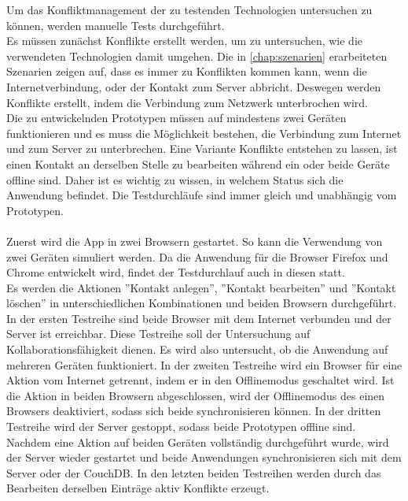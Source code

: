 Um das Konfliktmanagement der zu testenden Technologien untersuchen zu können, werden manuelle Tests durchgeführt.\\
Es müssen zunächst Konflikte erstellt werden, um zu untersuchen, wie die verwendeten Technologien damit umgehen.
Die in \autoref{chap:szenarien} erarbeiteten Szenarien zeigen auf, dass es immer zu Konflikten kommen kann, wenn die Internetverbindung, oder der Kontakt zum Server abbricht.
Deswegen werden Konflikte erstellt, indem die Verbindung zum Netzwerk unterbrochen wird.\\
Die zu entwickelnden Prototypen müssen auf mindestens zwei Geräten funktionieren und es muss die Möglichkeit bestehen, die Verbindung zum Internet und zum Server zu unterbrechen.
Eine Variante Konflikte entstehen zu lassen, ist einen Kontakt an derselben Stelle zu bearbeiten während ein oder beide Geräte offline sind. Daher ist es wichtig zu wissen, in welchem Status sich die Anwendung befindet.
Die Testdurchläufe sind immer gleich und unabhängig vom Prototypen.\\\\
%
%
Zuerst wird die \gls{App} in zwei Browsern gestartet.
So kann die Verwendung von zwei Geräten simuliert werden. Da die Anwendung für die Browser Firefox und Chrome entwickelt wird, findet der Testdurchlauf auch in diesen statt.\\
Es werden die Aktionen ''Kontakt anlegen'', ''Kontakt bearbeiten'' und ''Kontakt löschen'' in unterschiedlichen Kombinationen und beiden Browsern durchgeführt.
In der ersten Testreihe sind beide Browser mit dem Internet verbunden und der Server ist erreichbar.
Diese Testreihe soll der Untersuchung auf Kollaborationsfähigkeit dienen. Es wird also untersucht, ob die Anwendung auf mehreren Geräten funktioniert.
In der zweiten Testreihe wird ein Browser für eine Aktion vom Internet getrennt, indem er in den Offlinemodus geschaltet wird.
Ist die Aktion in beiden Browsern abgeschlossen, wird der Offlinemodus des einen Browsers deaktiviert, sodass sich beide synchronisieren können.
In der dritten Testreihe wird der Server gestoppt, sodass beide Prototypen offline sind. Nachdem eine Aktion auf beiden Geräten vollständig durchgeführt wurde, wird der Server wieder gestartet und beide Anwendungen synchronisieren sich mit dem Server oder der CouchDB. In den letzten beiden Testreihen werden durch das Bearbeiten derselben Einträge aktiv Konflikte erzeugt.\\
